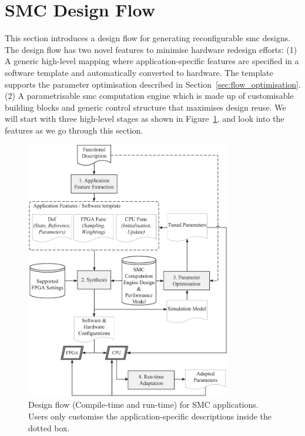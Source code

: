\section{SMC Design Flow}
\label{sec:flow_design}

This section introduces a design flow for generating reconfigurable \gls{smc} 
designs. The design flow has two novel features to minimise hardware redesign efforts:
(1) A generic high-level mapping where application-specific features are specified in a software template and automatically converted to hardware.
The template supports the parameter optimisation described in Section~\ref{sec:flow_optimisation}.
(2) A parametrisable \gls{smc} computation engine which is made up of customisable building blocks and generic control structure that maximises design reuse.
We will start with three high-level stages as shown in Figure~\ref{fig:flow}, and look into the features as we go through this section.

\begin{figure}[ht]
\begin{center}
\includegraphics[width=0.8\textwidth]{5_tool/figures/flow}
\end{center}
\caption{Design flow (Compile-time and run-time) for SMC applications. Users only customise the application-specific descriptions inside the dotted box.}
\label{fig:flow}
\end{figure}

